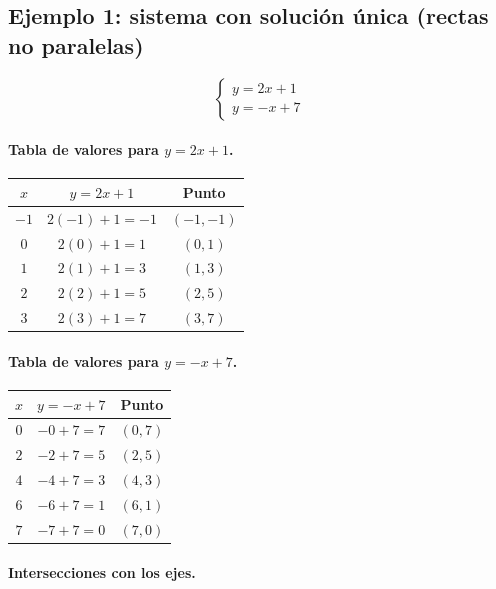 \documentclass[12pt]{article}
\begin{document}
\subsection{Ejemplo 1: sistema con solución única (rectas no paralelas)}

\[
\begin{cases}
y = 2x+1 \\
y = -x+7
\end{cases}
\]

\paragraph{Tabla de valores para \(y=2x+1\).}

\begin{center}
\begin{tabular}{ccc}
\toprule
\(x\) & \(y=2x+1\) & Punto \\
\midrule
\(-1\) & \(2(-1)+1=-1\) & \((-1,-1)\) \\
\(0\)  & \(2(0)+1=1\)     & \((0,1)\) \\
\(1\)  & \(2(1)+1=3\)     & \((1,3)\) \\
\(2\)  & \(2(2)+1=5\)     & \((2,5)\) \\
\(3\)  & \(2(3)+1=7\)     & \((3,7)\) \\
\bottomrule
\end{tabular}
\end{center}

\paragraph{Tabla de valores para \(y=-x+7\).}

\begin{center}
\begin{tabular}{ccc}
\toprule
\(x\) & \(y=-x+7\) & Punto \\
\midrule
\(0\) & \(-0+7=7\) & \((0,7)\) \\
\(2\) & \(-2+7=5\) & \((2,5)\) \\
\(4\) & \(-4+7=3\) & \((4,3)\) \\
\(6\) & \(-6+7=1\) & \((6,1)\) \\
\(7\) & \(-7+7=0\) & \((7,0)\) \\
\bottomrule
\end{tabular}
\end{center}

\paragraph{Intersecciones con los ejes.}
\end{document}
